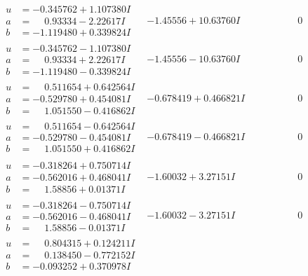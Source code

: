 \documentclass[1p]{elsarticle_modified}
\theoremstyle{definition}
\begin{document}
$$\begin{array}{c|c|c}
\begin{aligned}
u &= -0.345762 + 1.107380 I \\
a &= \phantom{-}0.93334 - 2.22617 I \\
b &= -1.119480 + 0.339824 I\end{aligned}
 & -1.45556 + 10.63760 I & \phantom{-0.000000 } 0 \\ \hline\begin{aligned}
u &= -0.345762 - 1.107380 I \\
a &= \phantom{-}0.93334 + 2.22617 I \\
b &= -1.119480 - 0.339824 I\end{aligned}
 & -1.45556 - 10.63760 I & \phantom{-0.000000 } 0 \\ \hline\begin{aligned}
u &= \phantom{-}0.511654 + 0.642564 I \\
a &= -0.529780 + 0.454081 I \\
b &= \phantom{-}1.051550 - 0.416862 I\end{aligned}
 & -0.678419 + 0.466821 I & \phantom{-0.000000 } 0 \\ \hline\begin{aligned}
u &= \phantom{-}0.511654 - 0.642564 I \\
a &= -0.529780 - 0.454081 I \\
b &= \phantom{-}1.051550 + 0.416862 I\end{aligned}
 & -0.678419 - 0.466821 I & \phantom{-0.000000 } 0 \\ \hline\begin{aligned}
u &= -0.318264 + 0.750714 I \\
a &= -0.562016 + 0.468041 I \\
b &= \phantom{-}1.58856 + 0.01371 I\end{aligned}
 & -1.60032 + 3.27151 I & \phantom{-0.000000 } 0 \\ \hline\begin{aligned}
u &= -0.318264 - 0.750714 I \\
a &= -0.562016 - 0.468041 I \\
b &= \phantom{-}1.58856 - 0.01371 I\end{aligned}
 & -1.60032 - 3.27151 I & \phantom{-0.000000 } 0 \\ \hline\begin{aligned}
u &= \phantom{-}0.804315 + 0.124211 I \\
a &= \phantom{-}0.138450 - 0.772152 I \\
b &= -0.093252 + 0.370978 I\end{aligned}

\end{array}$$
\end{document}
